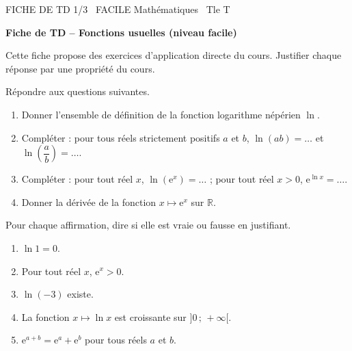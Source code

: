 \documentclass[11pt]{article}
\begin{document}
\begin{tcolorbox}[enhanced,colback=popink,colframe=popink,arc=10pt,boxrule=0pt,left=12pt,right=12pt,top=9pt,bottom=9pt]
{\color{white}\popxbold\small FICHE DE TD 1/3 \textbullet\ FACILE \hfill Mathématiques \textbullet\ Tle T\par}
\end{tcolorbox}
\vspace{4pt}
\textbf{Fiche de TD -- Fonctions usuelles (niveau facile)}

\smallskip
Cette fiche propose des exercices d'application directe du cours. Justifier chaque réponse par une propriété du cours.

\begin{exercice}
Répondre aux questions suivantes.
\begin{enumerate}
\item Donner l'ensemble de définition de la fonction logarithme népérien $\ln$.
\item Compléter : pour tous réels strictement positifs $a$ et $b$, $\ln(ab) = \ldots$ et $\ln\left(\dfrac{a}{b}\right) = \ldots$.
\item Compléter : pour tout réel $x$, $\ln(\mathrm{e}^x) = \ldots$ ; pour tout réel $x>0$, $\mathrm{e}^{\ln x} = \ldots$.
\item Donner la dérivée de la fonction $x \mapsto \mathrm{e}^x$ sur $\mathbb{R}$.
\end{enumerate}
\end{exercice}

\begin{exercice}
Pour chaque affirmation, dire si elle est vraie ou fausse en justifiant.
\begin{enumerate}
\item $\ln 1 = 0$.
\item Pour tout réel $x$, $\mathrm{e}^x > 0$.
\item $\ln(-3)$ existe.
\item La fonction $x \mapsto \ln x$ est croissante sur $]0\,;\,+\infty[$.
\item $\mathrm{e}^{a+b} = \mathrm{e}^a + \mathrm{e}^b$ pour tous réels $a$ et $b$.
\end{enumerate}
\end{exercice}
\end{document}
